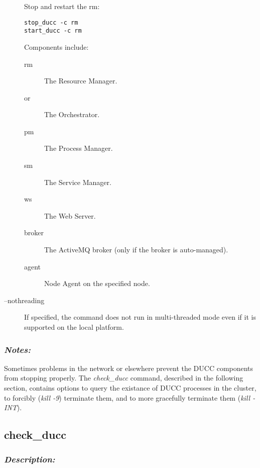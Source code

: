 \begin{description}
            Stop and restart the rm: 
\begin{verbatim}
stop_ducc -c rm 
start_ducc -c rm
\end{verbatim}
            
            Components include: 
            \begin{description}
              \item[rm] The Resource Manager.                 
              \item[or] The Orchestrator.                 
              \item[pm] The Process Manager.                 
              \item[sm] The Service Manager.                 
              \item[ws] The Web Server.                 
              \item[broker] The ActiveMQ broker (only if the broker is auto-managed).
              \item[agent\@node] Node Agent on the specified node.
              \end{description}

          \item[--nothreading] If specified, the command does not run in multi-threaded mode
            even if it is supported on the local platform.
              
       \end{description}
            
   \subsubsection{{\em Notes:}}
   Sometimes problems in the network or elsewhere prevent the DUCC components from stopping properly.  The
   {\em check\_ducc} command, described in the following section, contains options to query the
   existance of DUCC processes in the cluster, to forcibly ({\em kill -9}) terminate them, and to
   more gracefully terminate them ({\em kill -INT}).
          


\subsection{check\_ducc}
\label{subsec:admin.check-ducc}
    \subsubsection{{\em Description:}}

